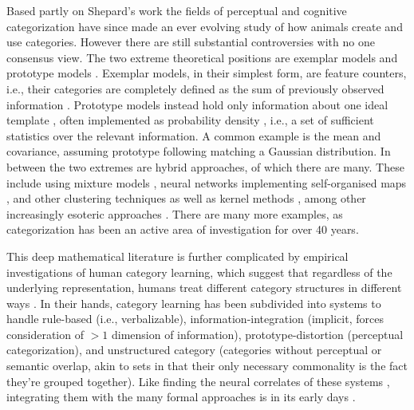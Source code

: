 Based partly on Shepard's work the fields of perceptual and cognitive categorization have since made an ever evolving study of how animals create and use categories.  However there are still substantial controversies with no one consensus view.  The two extreme theoretical positions are exemplar models and prototype models \cite{Ashby:2005p4764}.  Exemplar models, in their simplest form, are feature counters, i.e., their categories are completely defined as the sum of previously observed information \cite{Nosofsky:1988p9104}.  Prototype models instead hold only information about one ideal template \cite{Rosch:1973p9108}, often implemented as probability density \cite{Ashby:1995p9109}, i.e., a set of sufficient statistics over the relevant information.  A common example is the mean and covariance, assuming prototype following matching a Gaussian distribution.  In between the two extremes are hybrid approaches, of which there are many.  These include using mixture models \cite{Rossee:2002p9112}, neural networks implementing self-organised maps \cite{Love:2004p9110}, and other clustering techniques \cite{Kruschke:2012p9111} as well as kernel methods \cite{Jakel:2008p9113}, among other increasingly esoteric approaches \cite{Martin:2012p9185}. There are many more examples, as categorization has been an active area of investigation for over 40 years.

This deep mathematical literature is further complicated by empirical investigations of human category learning, which suggest that regardless of the underlying representation, humans treat different category structures in different ways \cite{Ashby:2011p9148}.  In their hands, category learning has been subdivided into systems to handle rule-based (i.e., verbalizable), information-integration (implicit, forces consideration of $>1$ dimension of information), prototype-distortion (perceptual categorization), and unstructured category (categories without perceptual or semantic overlap, akin to sets in that their only necessary commonality is the fact they're grouped together).  Like finding the neural correlates of these systems \cite{Ashby:2005p9152,Ashby:2006p9153}, integrating them with the many formal approaches is in its early days \cite{Ashby:2011p9148}.

